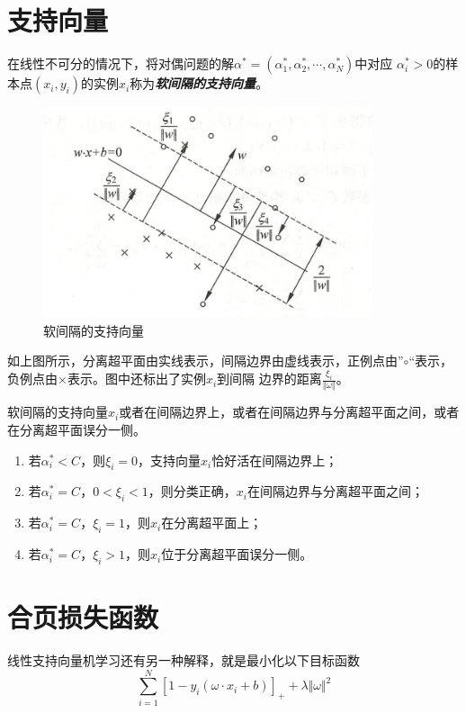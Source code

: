 \section{支持向量}

在线性不可分的情况下，将对偶问题的解$\alpha^*=(\alpha^*_1,\alpha^*_2,\cdots,\alpha^*_N)$中对应
$\alpha^*_i>0$的样本点$(x_i,y_i)$的实例$x_i$称为\textsl{\textbf{软间隔的支持向量}}。

\begin{figure}[H]
    \centering
    \includegraphics[scale=0.6]{figures/软间隔的支持向量.png}
    \caption{软间隔的支持向量}
    \label{软间隔的支持向量}
\end{figure}

如上图所示，分离超平面由实线表示，间隔边界由虚线表示，正例点由”$\circ$“表示，负例点由$\times$表示。图中还标出了实例$x_i$到间隔
边界的距离$\frac{\xi_i}{\Vert\omega\Vert}$。

软间隔的支持向量$x_i$或者在间隔边界上，或者在间隔边界与分离超平面之间，或者在分离超平面误分一侧。
\begin{enumerate}[itemindent=2em]
    \item 若$\alpha^*_i<C$，则$\xi_i=0$，支持向量$x_i$恰好活在间隔边界上；
    \item 若$\alpha^*_i=C$，$0<\xi_i<1$，则分类正确，$x_i$在间隔边界与分离超平面之间；
    \item 若$\alpha^*_i=C$，$\xi_i=1$，则$x_i$在分离超平面上；
    \item 若$\alpha^*_i=C$，$\xi_i>1$，则$x_i$位于分离超平面误分一侧。
\end{enumerate}


\section{合页损失函数}

线性支持向量机学习还有另一种解释，就是最小化以下目标函数
\begin{equation}
    \sum\limits_{i=1}^{N}[1-y_i(\omega\cdot x_i+b)]_{+}+\lambda\Vert\omega\Vert^2
\end{equation}

